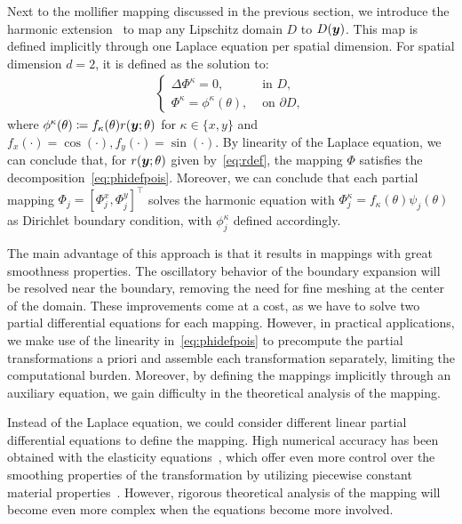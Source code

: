 Next to the mollifier mapping discussed in the previous section, we introduce the harmonic extension~\cite{li2001,xiu2006} to map any Lipschitz domain $D$ to ${D}({\bm{y}})$.
This map is defined implicitly through one Laplace equation per spatial dimension.
For spatial dimension $d=2$, it is defined as the solution to:
\begin{align}
    \begin{cases}
        \Delta \Phi^\kappa = 0, &\text{ in }D,\\
        \Phi^\kappa = \phi^\kappa(\theta),  &\text{ on }\partial D,
    \end{cases} \label{eq:harmonicext}
\end{align}
where $\phi^\kappa(\theta) \coloneqq f_\kappa(\theta) r({\bm{y}}; \theta)$ for $\kappa \in \{x, y\}$ and $f_x(\cdot) = \cos(\cdot), f_y(\cdot)=\sin(\cdot)$.
By linearity of the Laplace equation, we can conclude that, for $r({\bm{y}};\theta)$ given by~\eqref{eq:rdef}, the mapping $\Phi$ satisfies the decomposition~\eqref{eq:phidefpois}.
Moreover, we can conclude that each partial mapping $\Phi_j=[\Phi_j^x, \Phi_j^y]^\top$ solves the harmonic equation with $\Phi_j^\kappa = f_\kappa(\theta) \psi_j(\theta)$ as Dirichlet boundary condition, with $\phi_j^\kappa$ defined accordingly.

The main advantage of this approach is that it results in mappings with great smoothness properties.
The oscillatory behavior of the boundary expansion will be resolved near the boundary, removing the need for fine meshing at the center of the domain.
These improvements come at a cost, as we have to solve two partial differential equations for each mapping.
However, in practical applications, we make use of the linearity in~\eqref{eq:phidefpois} to precompute the partial transformations a priori and assemble each transformation separately, limiting the computational burden.
Moreover, by defining the mappings implicitly through an auxiliary equation, we gain difficulty in the theoretical analysis of the mapping.

Instead of the Laplace equation, we could consider different linear partial differential equations to define the mapping.
High numerical accuracy has been obtained with the elasticity equations~\cite{cizmas2008,dwight2009}, which offer even more control over the smoothing properties of the transformation by utilizing piecewise constant material properties~\cite{stein2003}.
However, rigorous theoretical analysis of the mapping will become even more complex when the equations become more involved.